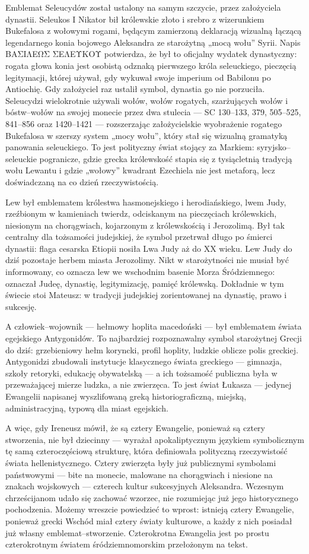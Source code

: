 Emblemat Seleucydów został ustalony na samym szczycie, przez założyciela dynastii.
Seleukos I Nikator bił królewskie złoto i srebro z wizerunkiem Bukefalosa z wołowymi rogami, będącym zamierzoną deklaracją wizualną łączącą legendarnego konia bojowego Aleksandra ze starożytną „mocą wołu” Syrii.
Napis ΒΑΣΙΛΕΩΣ ΣΕΛΕΥΚΟΥ potwierdza, że był to oficjalny wydatek dynastyczny: rogata głowa konia jest osobistą odznaką pierwszego króla seleuckiego, pieczęcią legitymacji, której używał, gdy wykuwał swoje imperium od Babilonu po Antiochię.
Gdy założyciel raz ustalił symbol, dynastia go nie porzuciła.
Seleucydzi wielokrotnie używali wołów, wołów rogatych, szarżujących wołów i bóstw–wołów na swojej monecie przez dwa stulecia — SC 130–133, 379, 505–525, 841–856 oraz 1420–1421 — rozszerzając założycielskie wyobrażenie rogatego Bukefalosa w szerszy system „mocy wołu”, który stał się wizualną gramatyką panowania seleuckiego.
To jest polityczny świat stojący za Markiem: syryjsko–seleuckie pogranicze, gdzie grecka królewskość stapia się z tysiącletnią tradycją wołu Lewantu i gdzie „wołowy” kwadrant Ezechiela nie jest metaforą, lecz doświadczaną na co dzień rzeczywistością.

Lew był emblematem królestwa hasmonejskiego i herodiańskiego, lwem Judy, rzeźbionym w kamieniach twierdz, odciskanym na pieczęciach królewskich, niesionym na chorągwiach, kojarzonym z królewskością i Jerozolimą.
Był tak centralny dla tożsamości judejskiej, że symbol przetrwał długo po śmierci dynastii: flaga cesarska Etiopii nosiła Lwa Judy aż do XX wieku.
Lew Judy do dziś pozostaje herbem miasta Jerozolimy.
Nikt w starożytności nie musiał być informowany, co oznacza lew we wschodnim basenie Morza Śródziemnego: oznaczał Judeę, dynastię, legitymizację, pamięć królewską.
Dokładnie w tym świecie stoi Mateusz: w tradycji judejskiej zorientowanej na dynastię, prawo i sukcesję.

A człowiek–wojownik — hełmowy hoplita macedoński — był emblematem świata egejskiego Antygonidów.
To najbardziej rozpoznawalny symbol starożytnej Grecji do dziś: grzebieniowy hełm koryncki, profil hoplity, ludzkie oblicze polis greckiej.
Antygonidzi zbudowali instytucje klasycznego świata greckiego — gimnazja, szkoły retoryki, edukację obywatelską — a ich tożsamość publiczna była w przeważającej mierze ludzka, a nie zwierzęca.
To jest świat Łukasza — jedynej Ewangelii napisanej wyszlifowaną greką historiograficzną, miejską, administracyjną, typową dla miast egejskich.

A więc, gdy Ireneusz mówił, że są cztery Ewangelie, ponieważ są cztery stworzenia, nie był dziecinny — wyrażał apokaliptycznym językiem symbolicznym tę samą czteroczęściową strukturę, która definiowała polityczną rzeczywistość świata hellenistycznego.
Cztery zwierzęta były już publicznymi symbolami państwowymi — bite na monecie, malowane na chorągwiach i niesione na znakach wojskowych — czterech kultur sukcesyjnych Aleksandra.
Wczesnym chrześcijanom udało się zachować wzorzec, nie rozumiejąc już jego historycznego pochodzenia.
Możemy wreszcie powiedzieć to wprost: istnieją cztery Ewangelie, ponieważ grecki Wschód miał cztery światy kulturowe, a każdy z nich posiadał już własny emblemat–stworzenie.
Czterokrotna Ewangelia jest po prostu czterokrotnym światem śródziemnomorskim przełożonym na tekst.

